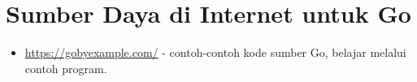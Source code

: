 \chapter{Sumber Daya di Internet untuk Go}

\begin{itemize}
\item \url{https://gobyexample.com/} - contoh-contoh kode sumber Go, belajar melalui contoh program.
\end{itemize}
